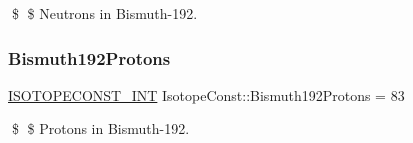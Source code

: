 \$ \$ Neutrons in Bismuth-\/192. \mbox{\label{group___isotope_const-_bismuth-_bi192_ga5512c398a987a8fbcb070f361d824692}} 
\subsubsection{\texorpdfstring{Bismuth192\+Protons}{Bismuth192Protons}}
{\footnotesize\ttfamily \mbox{\hyperlink{group___isotope_const-_macros_ga5f18360b3e99483a35c32d789e62621c}{I\+S\+O\+T\+O\+P\+E\+C\+O\+N\+S\+T\+\_\+\+I\+NT}} Isotope\+Const\+::\+Bismuth192\+Protons = 83}

\$ \$ Protons in Bismuth-\/192. 